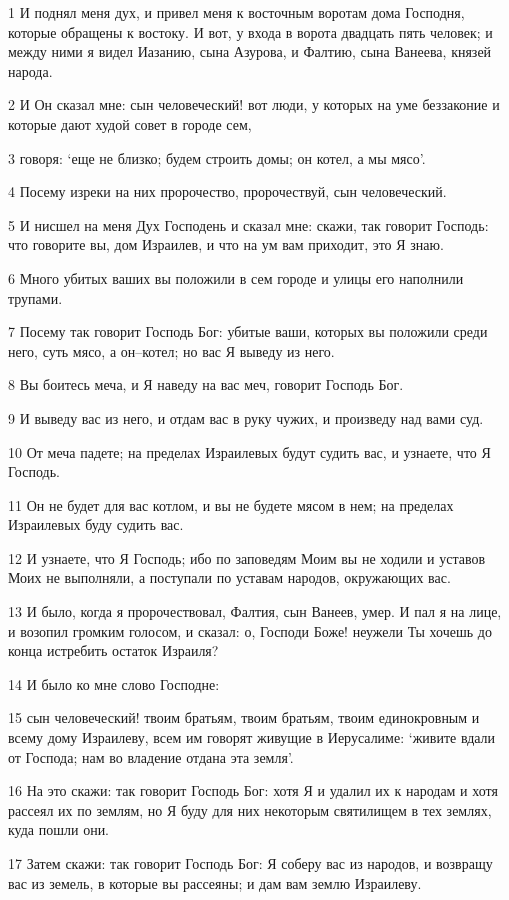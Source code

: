 \par 1 И поднял меня дух, и привел меня к восточным воротам дома Господня, которые обращены к востоку. И вот, у входа в ворота двадцать пять человек; и между ними я видел Иазанию, сына Азурова, и Фалтию, сына Ванеева, князей народа.
\par 2 И Он сказал мне: сын человеческий! вот люди, у которых на уме беззаконие и которые дают худой совет в городе сем,
\par 3 говоря: `еще не близко; будем строить домы; он котел, а мы мясо'.
\par 4 Посему изреки на них пророчество, пророчествуй, сын человеческий.
\par 5 И нисшел на меня Дух Господень и сказал мне: скажи, так говорит Господь: что говорите вы, дом Израилев, и что на ум вам приходит, это Я знаю.
\par 6 Много убитых ваших вы положили в сем городе и улицы его наполнили трупами.
\par 7 Посему так говорит Господь Бог: убитые ваши, которых вы положили среди него, суть мясо, а он--котел; но вас Я выведу из него.
\par 8 Вы боитесь меча, и Я наведу на вас меч, говорит Господь Бог.
\par 9 И выведу вас из него, и отдам вас в руку чужих, и произведу над вами суд.
\par 10 От меча падете; на пределах Израилевых будут судить вас, и узнаете, что Я Господь.
\par 11 Он не будет для вас котлом, и вы не будете мясом в нем; на пределах Израилевых буду судить вас.
\par 12 И узнаете, что Я Господь; ибо по заповедям Моим вы не ходили и уставов Моих не выполняли, а поступали по уставам народов, окружающих вас.
\par 13 И было, когда я пророчествовал, Фалтия, сын Ванеев, умер. И пал я на лице, и возопил громким голосом, и сказал: о, Господи Боже! неужели Ты хочешь до конца истребить остаток Израиля?
\par 14 И было ко мне слово Господне:
\par 15 сын человеческий! твоим братьям, твоим братьям, твоим единокровным и всему дому Израилеву, всем им говорят живущие в Иерусалиме: `живите вдали от Господа; нам во владение отдана эта земля'.
\par 16 На это скажи: так говорит Господь Бог: хотя Я и удалил их к народам и хотя рассеял их по землям, но Я буду для них некоторым святилищем в тех землях, куда пошли они.
\par 17 Затем скажи: так говорит Господь Бог: Я соберу вас из народов, и возвращу вас из земель, в которые вы рассеяны; и дам вам землю Израилеву.
